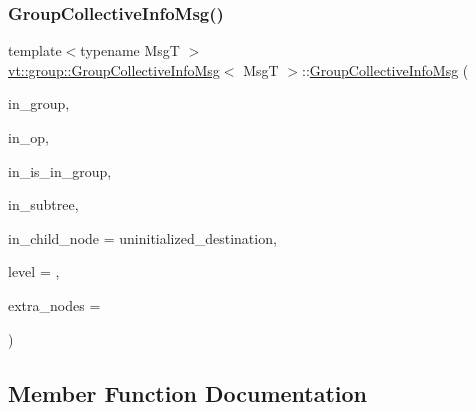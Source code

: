 \subsubsection{\texorpdfstring{Group\+Collective\+Info\+Msg()}{GroupCollectiveInfoMsg()}\hspace{0.1cm}{\footnotesize\ttfamily [2/2]}}
{\footnotesize\ttfamily template$<$typename MsgT $>$ \\
\hyperlink{structvt_1_1group_1_1_group_collective_info_msg}{vt\+::group\+::\+Group\+Collective\+Info\+Msg}$<$ MsgT $>$\+::\hyperlink{structvt_1_1group_1_1_group_collective_info_msg}{Group\+Collective\+Info\+Msg} (\begin{DoxyParamCaption}\item[{\hyperlink{namespacevt_a27b5e4411c9b6140c49100e050e2f743}{Group\+Type} const \&}]{in\+\_\+group,  }\item[{\hyperlink{namespacevt_1_1group_a73f2624ddeb535b39a08b6524f26b244}{Remote\+Operation\+I\+D\+Type}}]{in\+\_\+op,  }\item[{bool}]{in\+\_\+is\+\_\+in\+\_\+group,  }\item[{\hyperlink{namespacevt_a866da9d0efc19c0a1ce79e9e492f47e2}{Node\+Type} const \&}]{in\+\_\+subtree,  }\item[{\hyperlink{namespacevt_a866da9d0efc19c0a1ce79e9e492f47e2}{Node\+Type} const \&}]{in\+\_\+child\+\_\+node = {\ttfamily uninitialized\+\_\+destination},  }\item[{\hyperlink{structvt_1_1group_1_1_group_collective_info_msg_a3d20316314d3cc3ac13ff4c5250203a5}{Count\+Type} const \&}]{level = {},  }\item[{\hyperlink{structvt_1_1group_1_1_group_collective_info_msg_a3d20316314d3cc3ac13ff4c5250203a5}{Count\+Type} const \&}]{extra\+\_\+nodes = {} }\end{DoxyParamCaption})\hspace{0.3cm}{\ttfamily [inline]}}



\subsection{Member Function Documentation}
\mbox{\label{structvt_1_1group_1_1_group_collective_info_msg_a5e4adf90fa896fbb82b80b72edefc7d4}} 
